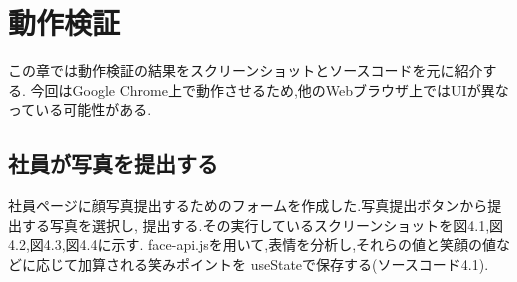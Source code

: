 \chapter{動作検証}
\label{chp:tex_pro}
この章では動作検証の結果をスクリーンショットとソースコードを元に紹介する.
今回はGoogle Chrome上で動作させるため,他のWebブラウザ上ではUIが異なっている可能性がある.

\section{社員が写真を提出する}
\label{sec:tex_pro_cmd}
社員ページに顔写真提出するためのフォームを作成した.写真提出ボタンから提出する写真を選択し,
提出する.その実行しているスクリーンショットを図4.1,図4.2,図4.3,図4.4に示す.
face-api.jsを用いて,表情を分析し,それらの値と笑顔の値などに応じて加算される笑みポイントを
useStateで保存する(ソースコード4.1).
\\

\renewcommand{\lstlistingname}{ソースコード}

